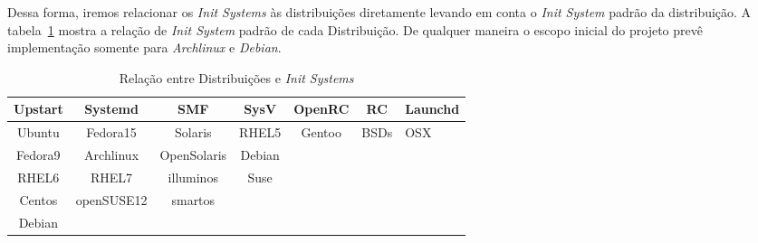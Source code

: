 Dessa forma, iremos relacionar os \textit{Init Systems} às distribuições
diretamente levando em conta o \textit{Init System} padrão da distribuição.
A tabela~\ref{tab:inits-distro} mostra a relação de \textit{Init System} padrão de cada 
Distribuição. De qualquer maneira o escopo inicial do projeto prevê
implementação somente para \textit{Archlinux} e \textit{Debian}.

\begin{table}[H]
\centering
\caption{Relação entre Distribuições e \textit{Init Systems}}
\label{tab:inits-distro}
\begin{tabular}{|c|cccccl}
\hline
\rowcolor[HTML]{C0C0C0} 
Upstart & \multicolumn{1}{c|}{\cellcolor[HTML]{C0C0C0}Systemd} & \multicolumn{1}{c|}{\cellcolor[HTML]{C0C0C0}SMF} & \multicolumn{1}{c|}{\cellcolor[HTML]{C0C0C0}SysV} & \multicolumn{1}{c|}{\cellcolor[HTML]{C0C0C0}OpenRC} & \multicolumn{1}{c|}{\cellcolor[HTML]{C0C0C0}RC} & \multicolumn{1}{l|}{\cellcolor[HTML]{C0C0C0}Launchd} \\ \hline
Ubuntu  & \multicolumn{1}{c|}{Fedora15}                        & \multicolumn{1}{c|}{Solaris}                     & \multicolumn{1}{c|}{RHEL5}                        & \multicolumn{1}{c|}{Gentoo}                         & \multicolumn{1}{c|}{BSDs}                       & \multicolumn{1}{l|}{OSX}                             \\ \hline
Fedora9 & \multicolumn{1}{c|}{Archlinux}                       & \multicolumn{1}{c|}{OpenSolaris}                 & \multicolumn{1}{c|}{Debian}                       &                                                     &                                                 &                                                      \\ \cline{1-4}
RHEL6   & \multicolumn{1}{c|}{RHEL7}                           & \multicolumn{1}{c|}{illuminos}                   & \multicolumn{1}{c|}{Suse}                         &                                                     &                                                 &                                                      \\ \cline{1-4}
Centos  & \multicolumn{1}{c|}{openSUSE12}                      & \multicolumn{1}{c|}{smartos}                     &                                                   &                                                     &                                                 &                                                      \\ \cline{1-3}
Debian  &                                                      &                                                  &                                                   &                                                     &                                                 &                                                      \\ \cline{1-1}
\end{tabular}
\end{table}

